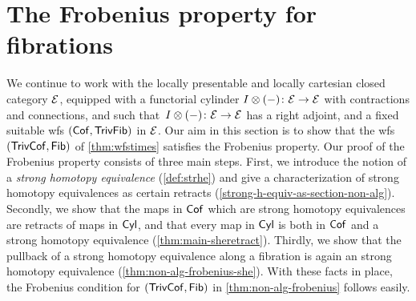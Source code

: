 \documentclass[reqno,10pt,a4paper,oneside,draft]{amsart}
\begin{document}
\section{The Frobenius property for fibrations}
\label{sec:frob}

We continue to work with the locally presentable and locally cartesian closed category $\mathcal{E}$, equipped with a functorial cylinder $I\otimes (-) \colon \mathcal{E} \to \mathcal{E}$ with contractions and connections, and such that~$I\otimes (-) \colon \mathcal{E} \to \mathcal{E}$ has a right adjoint, and a fixed suitable wfs $(\mathsf{Cof}, \mathsf{TrivFib})$ in $\mathcal{E}$.
Our aim in this section is to show that the wfs $(\mathsf{TrivCof}, \mathsf{Fib})$ of \cref{thm:wfstimes} satisfies the Frobenius property.
Our proof of the Frobenius property consists of three main steps.
First, we introduce the notion of a \emph{strong homotopy equivalence} (\cref{def:strhe}) and give a characterization of strong homotopy equivalences as certain retracts (\cref{strong-h-equiv-as-section-non-alg}).
Secondly, we show that the maps in $\mathsf{Cof}$ which are strong homotopy equivalences are retracts of maps in $\mathsf{Cyl}$, and that every map in $\mathsf{Cyl}$ is both in $\mathsf{Cof}$ and a strong homotopy
equivalence (\cref{thm:main-sheretract}).
Thirdly, we show that the pullback of a strong homotopy equivalence along a fibration is again an strong homotopy equivalence (\cref{thm:non-alg-frobenius-she}).
With these facts in place, the Frobenius condition for $(\mathsf{TrivCof}, \mathsf{Fib})$ in \cref{thm:non-alg-frobenius} follows easily.
\end{document}
